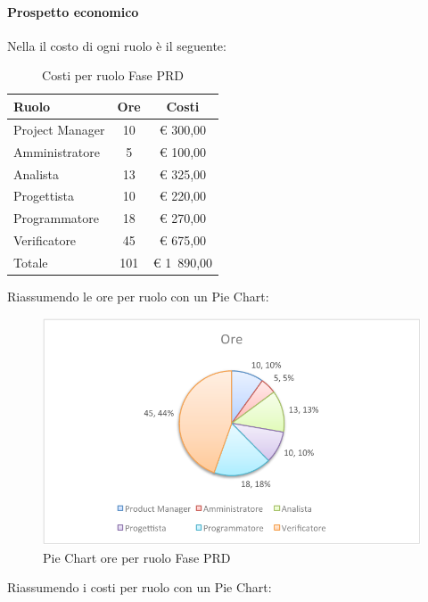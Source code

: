 			\paragraph{Prospetto economico}
				Nella  il costo di ogni ruolo è il seguente:
				\begin{table}[H]
					\begin{center}
						\begin{tabular}{| l | c | c |}
							\hline
							Ruolo 			& Ore 	& Costi  \\ \hline
							
							Project Manager	& 10 		& \euro{} 300,00 	\\
							Amministratore 		& 5 		& \euro{} 100,00 	\\
							Analista	 		& 13 		& \euro{} 325,00 	\\
							Progettista 		& 10 		& \euro{} 220,00  	\\
							Programmatore		& 18		& \euro{} 270,00 	\\
							Verificatore		& 45 		& \euro{} 675,00 	\\ \hline \hline
							
							Totale	 		& 101 	& \euro{} 1~890,00 	\\ \hline
						\end{tabular}
					\end{center}
					\caption{Costi per ruolo Fase PRD}
				\end{table}
				Riassumendo le ore per ruolo con un Pie Chart:
				\begin{figure}[H]\centering
					\includegraphics[width=\textwidth]{PianoDiProgetto/Pics/ChartTotOreFasePRD.pdf}
					\caption{Pie Chart ore per ruolo Fase PRD}
				\end{figure}
				Riassumendo i costi per ruolo con un Pie Chart:
